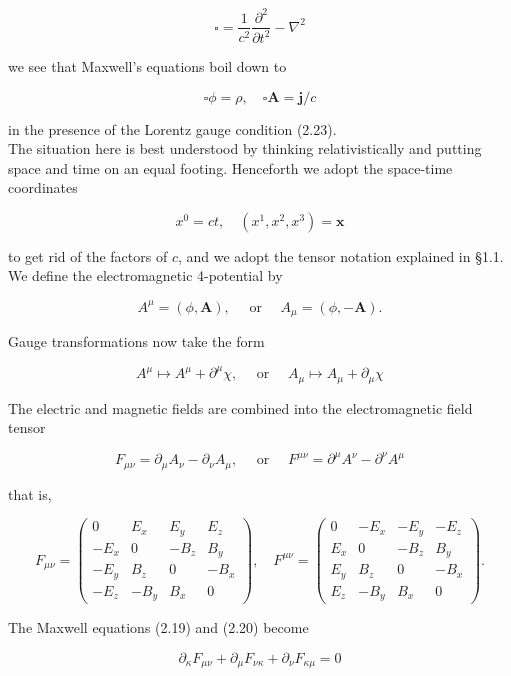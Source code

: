 \documentclass[10pt, letterpaper]{article}
\begin{document}
$$
\square=\frac{1}{c^{2}} \frac{\partial^{2}}{\partial t^{2}}-\nabla^{2}
$$

we see that Maxwell's equations boil down to

$$
\square \phi=\rho, \quad \square \mathbf{A}=\mathbf{j} / c
$$

in the presence of the Lorentz gauge condition (2.23).\\
The situation here is best understood by thinking relativistically and putting space and time on an equal footing. Henceforth we adopt the space-time coordinates

$$
x^{0}=c t, \quad\left(x^{1}, x^{2}, x^{3}\right)=\mathbf{x}
$$

to get rid of the factors of $c$, and we adopt the tensor notation explained in §1.1. We define the electromagnetic 4-potential by

$$
A^{\mu}=(\phi, \mathbf{A}), \quad \text { or } \quad A_{\mu}=(\phi,-\mathbf{A}) .
$$

Gauge transformations now take the form

$$
A^{\mu} \mapsto A^{\mu}+\partial^{\mu} \chi, \quad \text { or } \quad A_{\mu} \mapsto A_{\mu}+\partial_{\mu} \chi
$$

The electric and magnetic fields are combined into the electromagnetic field tensor

$$
F_{\mu \nu}=\partial_{\mu} A_{\nu}-\partial_{\nu} A_{\mu}, \quad \text { or } \quad F^{\mu \nu}=\partial^{\mu} A^{\nu}-\partial^{\nu} A^{\mu}
$$

that is,

$$
F_{\mu \nu}=\left(\begin{array}{cccc}
0 & E_{x} & E_{y} & E_{z} \\
-E_{x} & 0 & -B_{z} & B_{y} \\
-E_{y} & B_{z} & 0 & -B_{x} \\
-E_{z} & -B_{y} & B_{x} & 0
\end{array}\right), \quad F^{\mu \nu}=\left(\begin{array}{cccc}
0 & -E_{x} & -E_{y} & -E_{z} \\
E_{x} & 0 & -B_{z} & B_{y} \\
E_{y} & B_{z} & 0 & -B_{x} \\
E_{z} & -B_{y} & B_{x} & 0
\end{array}\right) .
$$

The Maxwell equations (2.19) and (2.20) become

$$
\partial_{\kappa} F_{\mu \nu}+\partial_{\mu} F_{\nu \kappa}+\partial_{\nu} F_{\kappa \mu}=0
$$
\end{document}
